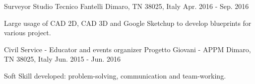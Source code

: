 \begin{cventries}
  \cventry
    {Surveyor} %
    {Studio Tecnico Fantelli} %
    {Dimaro, TN 38025, Italy} %
    {Apr. 2016 - Sep. 2016} %
    {
      \begin{cvitems} %
        \item {Large usage of CAD 2D, CAD 3D and Google Sketchup to develop blueprints for various project.}
      \end{cvitems}
    }

  \cventry
    {Civil Service - Educator and events organizer} %
    {Progetto Giovani - APPM} %
    {Dimaro, TN 38025, Italy} %
    {Jun. 2015 - Jun. 2016} %
    {
      \begin{cvitems} %
        \item {Soft Skill developed: problem-solving, communication and team-working.}
      \end{cvitems}
    }

\end{cventries}
